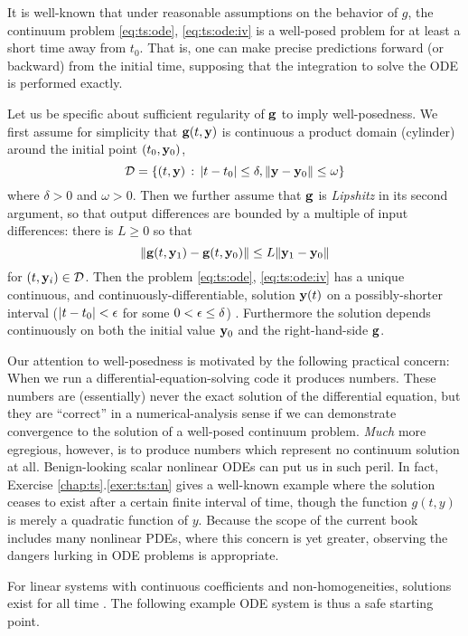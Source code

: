 It is well-known that under reasonable assumptions on the behavior of $g$, the continuum problem \eqref{eq:ts:ode}, \eqref{eq:ts:ode:iv} is a well-posed problem for at least a short time away from $t_0$.  That is, one can make precise predictions forward (or backward) from the initial time, supposing that the integration to solve the ODE is performed exactly.

Let us be specific about sufficient regularity of $\mathbf{g}$ to imply well-posedness.  We first assume for simplicity that $\mathbf{g}(t,\mathbf{y})$ is continuous a product domain (cylinder) around the initial point $(t_0,\mathbf{y}_0)$,
   $$\mathcal{D} = \{(t,\mathbf{y}) \,:\, |t-t_0| \le \delta, \|\mathbf{y} - \mathbf{y}_0\| \le \omega\}$$
where $\delta > 0$ and $\omega > 0$.  Then we further assume that $\mathbf{g}$ is \emph{Lipshitz} in its second argument, so that output differences are bounded by a multiple of input differences: there is $L\ge 0$ so that
   $$\|\mathbf{g}(t,\mathbf{y}_1) - \mathbf{g}(t,\mathbf{y}_0)\| \le L \|\mathbf{y}_1-\mathbf{y}_0\|$$
for $(t,\mathbf{y}_i) \in \mathcal{D}$.  Then the problem \eqref{eq:ts:ode}, \eqref{eq:ts:ode:iv} has a unique continuous, and continuously-differentiable, solution $\mathbf{y}(t)$ on a possibly-shorter interval ($|t-t_0|<\epsilon$ for some $0 < \epsilon \le \delta$) \citep[section 17.5]{HirschSmaleDevaney2004}.  Furthermore the solution depends continuously on both the initial value $\mathbf{y}_0$ and the right-hand-side $\mathbf{g}$.

Our attention to well-posedness is motivated by the following practical concern:  When we run a differential-equation-solving code it produces numbers.  These numbers are (essentially) never the exact solution of the differential equation, but they are ``correct'' in a numerical-analysis sense if we can demonstrate convergence to the solution of a well-posed continuum problem.  \emph{Much} more egregious, however, is to produce numbers which represent no continuum solution at all.  Benign-looking scalar nonlinear ODEs can put us in such peril.  In fact, Exercise \ref{chap:ts}.\ref{exer:ts:tan} gives a well-known example where the solution ceases to exist after a certain finite interval of time, though the function $g(t,y)$ is merely a quadratic function of $y$.  Because the scope of the current book includes many nonlinear PDEs, where this concern is yet greater, observing the dangers lurking in ODE problems is appropriate.

For linear systems with continuous coefficients and non-homogeneities, solutions exist for all time \citep[section 17.5]{HirschSmaleDevaney2004}.  The following example ODE system is thus a safe starting point.

